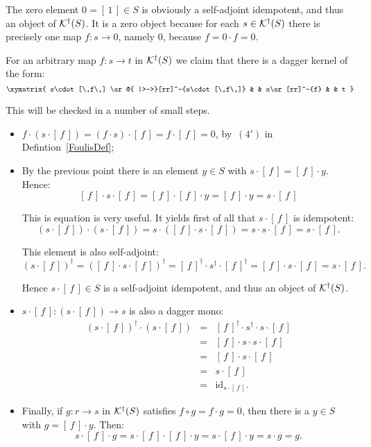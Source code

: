 \documentclass{article}
\newenvironment{proof}[1][Proof]{ \begin{trivlist}\item[\hskip \labelsep {\bfseries #1}]}{ \end{trivlist}}
\newcommand{\after}{\mathrel{\circ}}
\newcommand{\idmap}[1][]{\ensuremath{\mathrm{id}_{#1}}}
\newcommand{\dagKaroubi}[1]{{\cal K}^{\dag}(#1)}
\newcommand{\sai}[1]{[\,#1\,]}
\begin{document}
\begin{proof}
The zero element $0 = \sai{1} \in S$ is obviously a self-adjoint
idempotent, and thus an object of $\dagKaroubi{S}$. It is a zero
object because for each $s\in\dagKaroubi{S}$ there is precisely one
map $f\colon s\rightarrow 0$, namely $0$, because $f = 0\cdot f = 0$.

For an arbitrary map $f\colon s\rightarrow t$ in $\dagKaroubi{S}$
we claim that there is a dagger kernel of the form:
$$\xymatrix{
s\cdot \sai{f} \ar@{ |>->}[rr]^-{s\cdot \sai{f}} & & s\ar[rr]^-{f} & & t
}$$

\noindent This will be checked in a number of small steps.
\begin{itemize}
\item $f\cdot (s\cdot \sai{f}) = (f\cdot s) \cdot \sai{f} = f\cdot \sai{f} = 0$,
by~$(4')$ in Defintion~\ref{FoulisDef};

\item By the previous point there is an element $y\in S$ with
$s\cdot \sai{f} = \sai{f}\cdot y$. Hence:
$$\sai{f}\cdot s\cdot \sai{f}
=
\sai{f}\cdot \sai{f} \cdot y
=
\sai{f}\cdot y
=
s\cdot \sai{f}$$

\noindent This is equation is very useful. It yields first of all that
$s\cdot \sai{f}$ is idempotent:
$$(s\cdot \sai{f})\cdot (s\cdot \sai{f})
=
s\cdot (\sai{f}\cdot s\cdot \sai{f})
=
s\cdot s\cdot \sai{f}
=
s\cdot \sai{f}.$$

\noindent This element is also self-adjoint:
$$(s\cdot \sai{f})^{\dag}
=
(\sai{f}\cdot s\cdot \sai{f})^{\dag} 
=
\sai{f}^{\dag} \cdot s^{\dag} \cdot \sai{f}^{\dag} 
=
\sai{f}\cdot s\cdot \sai{f} 
=
s\cdot \sai{f}.$$

\noindent Hence $s\cdot \sai{f}\in S$ is a self-adjoint idempotent, and
thus an object of $\dagKaroubi{S}$.

\item $s\cdot \sai{f}\colon (s\cdot \sai{f})\rightarrow s$ is also a dagger mono:
$$\begin{array}{rcl}
(s\cdot \sai{f})^{\dag} \cdot (s\cdot \sai{f})
& = &
\sai{f}^{\dag} \cdot s^{\dag} \cdot s \cdot \sai{f} \\
& = &
\sai{f} \cdot s \cdot s \cdot \sai{f} \\
& = &
\sai{f} \cdot s \cdot \sai{f} \\
& = &
s\cdot \sai{f} \\
& = &
\idmap[s\cdot \sai{f}].
\end{array}$$

\item Finally, if $g\colon r\rightarrow s$ in $\dagKaroubi{S}$
  satisfies $f \after g = f\cdot g = 0$, then there is a $y\in S$
  with $g = \sai{f}\cdot y$. Then:
$$s\cdot \sai{f}\cdot g
=
s\cdot \sai{f} \cdot \sai{f} \cdot y
=
s\cdot \sai{f} \cdot y
=
s\cdot g
= 
g.$$


\end{itemize}
\end{proof}
\end{document}
